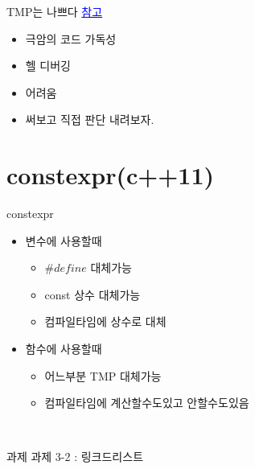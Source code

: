 \documentclass[10pt]{beamer}
\begin{document}
\begin{frame}{TMP는 나쁘다}
    \href{https://www.youtube.com/watch?v=a6BQphLoTag&feature=youtu.be}{\textcolor{blue}{참고}}
    \begin{itemize}
        \item 극암의 코드 가독성
        \item 헬 디버깅
        \item 어려움
        \item 써보고 직접 판단 내려보자.
    \end{itemize}
\end{frame}    


\section{constexpr(c++11)}

\begin{frame}[fragile]{constexpr}
    \begin{itemize}
        \item 변수에 사용할때
        \begin{itemize}
            \item $\#define$ 대체가능
            \item const 상수 대체가능
            \item 컴파일타임에 상수로 대체
        \end{itemize}
        \item 함수에 사용할때
        \begin{itemize}
            \item 어느부분 TMP 대체가능
            \item 컴파일타임에 계산할수도있고 안할수도있음
        \end{itemize}
    \end{itemize}
\end{frame}    

\begin{frame}[fragile]{}
        
    \begin{lstlisting}[style = CStyle]
    
    \end{lstlisting}

\end{frame}   






\begin{frame}{과제}
    과제 3-2 : 링크드리스트
\end{frame}    
\end{document}
